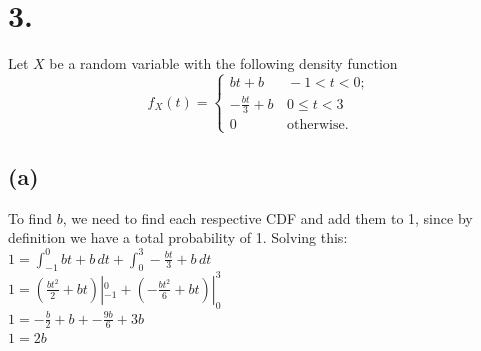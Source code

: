 \documentclass{article}
\begin{document}
\section*{3.}
{\Large 
Let $X$ be a random variable with the following density function
\[
f_{X}\left(t\right)=\begin{cases}
bt+b & \,-1<t<0;\\
-\frac{bt}{3}+b & \,0\le t<3\\
0 & \,\mbox{otherwise.}
\end{cases}
\]

\subsection*{(a)}
To find $b$, we need to find each respective CDF and add them to 1, since by definition we have a total probability of 1. Solving this: \\ 
$1 = \int_{-1}^{0} bt + b \,dt + \int_{0}^{3} -\frac{bt}{3} + b \,dt$ \\ 
$1 =  (\frac{bt^2}{2} + bt) |_{-1}^{0} + (-\frac{bt^2}{6} + bt) |_{0}^{3}$ \\ 
$1 =  -\frac{b}{2} + b + -\frac{9b}{6} + 3b$ \\ 
$1 =  2b$ \\ 

}
\end{document}
